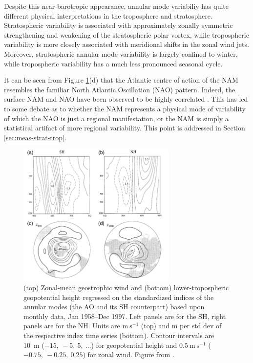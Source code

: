 Despite this near-barotropic appearance, annular mode variabiliy has quite
different physical interpretations in the troposphere and
stratosphere. Stratospheric variability is associated with approximately zonally
symmetric strengthening and weakening of the stratospheric polar vortex, while
tropospheric variability is more closely associated with meridional shifts in
the zonal wind jets. Moreover, stratospheric annular mode variability is largely
confined to winter, while tropospheric variability has a much less pronounced
seasonal cycle.  

It can be seen from Figure \ref{fig:annular_modes}(d) that the Atlantic centre
of action of the NAM resembles the familiar North Atlantic Oscillation (NAO)
pattern. Indeed, the surface NAM and NAO have been observed to be highly
correlated \citep{Ambaum2001}. This has led to some debate as to whether the NAM
represents a physical mode of variability of which the NAO is just a regional
manifestation, or the NAM is simply a statistical artifact of more regional
variability. This point is addressed in Section \ref{sec:meas-strat-trop}.

\begin{figure}
 \centering
 \noindent\includegraphics[width=0.7\textwidth]{figures/chapter-intro/annular_modes_TW.png}
 \caption[Annular mode patterns from \citet{Thompson2000a}]{(top) Zonal-mean
   geostrophic wind and (bottom) lower-tropospheric geopotential height
   regressed on the standardized indices of the annular modes (the AO and its SH
   counterpart) based upon monthly data, Jan 1958--Dec 1997. Left panels are for
   the SH, right panels are for the NH. Units are $\mathrm{m~s^{-1}}$ (top) and
   m per std dev of the respective index time series (bottom). Contour intervals
   are 10~m ($-15,~-5,~5,~\dots$) for geopotential height and
   $\mathrm{0.5~m~s^{-1}}$ ($-0.75,~-0.25,~0.25$) for zonal wind. Figure from
   \citet{Thompson2000a}.}
 \label{fig:annular_modes}
\end{figure}


